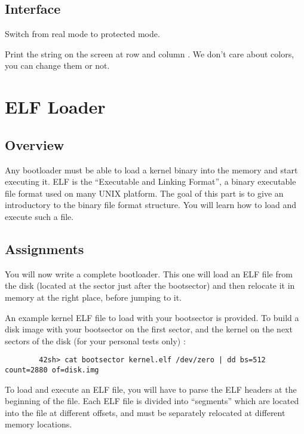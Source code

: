 \subsection*{Interface}
{
  Switch from real mode to protected mode.
}

{
  Print the string  on the screen at row 
  and column . We don't care about colors, you can change them
  or not.
}

%
%

\newpage

\section{ELF Loader}

\subsection*{Overview}
Any bootloader must be able to load a kernel binary into the memory and start
executing it. ELF is the ``Executable and Linking Format'', a binary executable
file format used on many UNIX platform. The goal of this part is to give an 
introductory to the binary file format structure. You will learn how to load
and execute such a file.

\subsection*{Assignments}
You will now write a complete bootloader. This one will load an ELF file from
the disk (located at the sector just after the bootsector) and then relocate
it in memory at the right place, before jumping to it.

An example kernel ELF file to load with your bootsector is provided. To build
a disk image with your bootsector on the first sector, and the kernel on the
next sectors of the disk (for your personal tests only) :

\begin{verbatim}
        42sh> cat bootsector kernel.elf /dev/zero | dd bs=512 count=2880 of=disk.img
\end{verbatim}

To load and execute an ELF file, you will have to parse the ELF headers at the
beginning of the file. Each ELF file is divided into ``segments'' which are
located into the file at different offsets, and must be separately relocated
at different memory locations.

